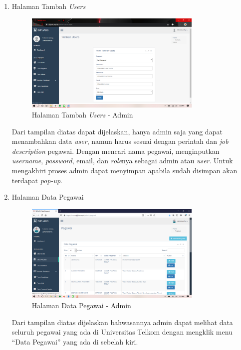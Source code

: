 \begin{enumerate}
	\newpage
	\item Halaman Tambah \textit{Users}
	\begin{figure}
		\centering
		\includegraphics[width=0.8\textwidth]
		{pics/admin/implementasi/tambahusers.png}
		\caption{Halaman Tambah \textit{Users} - Admin}
		\label{fig:CC10}
	\end{figure}
	Dari tampilan diatas dapat dijelaskan, hanya admin saja yang dapat menambahkan data \textit{user}, namun harus sesuai dengan perintah dan \textit{job description} pegawai. Dengan mencari nama pegawai, menginputkan \textit{username}, \textit{password}, email, dan \textit{role}nya sebagai admin atau \textit{user}. Untuk mengakhiri proses admin dapat menyimpan apabila sudah disimpan akan terdapat \textit{pop-up}.
	
	\item Halaman Data Pegawai
	\begin{figure}
		\centering
		\includegraphics[width=0.8\textwidth]
		{pics/admin/implementasi/datapegawai.png}
		\caption{Halaman Data Pegawai - Admin}
		\label{fig:CC10}
	\end{figure}
	Dari tampilan diatas dijelaskan bahwasannya admin dapat melihat data seluruh pegawai yang ada di Universitas Telkom dengan mengklik menu “Data Pegawai” yang ada di sebelah kiri.
	

\end{enumerate}
